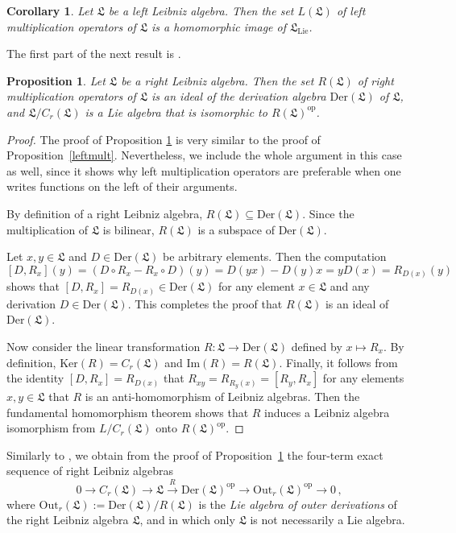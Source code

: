 \documentclass{amsart}
\newtheorem{pro}[thm]{Proposition}
\newtheorem{cor}[thm]{Corollary}
\numberwithin{equation}{section}
\newcommand{\op}{\mathrm{op}}
\newcommand{\der}{\mathrm{Der}}
\newcommand{\out}{\mathrm{Out}}
\newcommand{\lie}{\mathrm{Lie}}
\newcommand{\Ker}{\mathrm{Ker}}
\newcommand{\im}{\mathrm{Im}}
\newcommand{\lf}{\mathfrak{L}}
\begin{document}
\begin{cor}\label{leftleiblie}
Let $\lf$ be a left Leibniz algebra. Then the set $L(\lf)$ of left multiplication operators of $\lf$ is a
homomorphic image of $\lf_\lie$.
\end{cor}

The first part of the next result is \cite[Theorem 2.3]{FM}.

\begin{pro}\label{rightmult}
Let $\lf$ be a right Leibniz algebra. Then the set $R(\lf)$ of right multiplication operators of $\lf$
is an ideal of the derivation algebra $\der(\lf)$ of $\lf$, and $\lf/C_r(\lf)$ is a Lie algebra that is
isomorphic to $R(\lf)^\op$.
\end{pro}

\begin{proof}
The proof of Proposition \ref{rightmult} is very similar to the proof of Proposition~\ref{leftmult}.
Nevertheless, we include the whole argument in this case as well, since it shows why left multiplication
operators are preferable when one writes functions on the left of their arguments.

By definition of a right Leibniz algebra, $R(\lf)\subseteq\der(\lf)$. Since the multiplication of $\lf$ is
bilinear, $R(\lf)$ is a subspace of $\der(\lf)$.

Let $x,y\in\lf$ and $D\in\der(\lf)$ be arbitrary elements. Then the computation $$[D,R_x](y)=(D
\circ R_x-R_x\circ D)(y)=D(yx)-D(y)x=yD(x)=R_{D(x)}(y)$$ shows that $[D,R_x]=R_{D(x)}\in
\der(\lf)$ for any element $x\in\lf$ and any derivation $D\in\der(\lf)$. This completes the proof
that $R(\lf)$ is an ideal of $\der(\lf)$.

Now consider the linear transformation $R:\lf\to\der(\lf)$ defined by $x\mapsto R_x$. By definition,
$\Ker(R)=C_r(\lf)$ and $\im(R)=R(\lf)$. Finally, it follows from the identity $[D,R_x]=R_{D(x)}$
that $R_{xy}=R_{R_y(x)}=[R_y,R_x]$ for any elements $x,y\in\lf$ that $R$ is an anti-homomorphism
of Leibniz algebras. Then the fundamental homomorphism theorem shows that $R$ induces a Leibniz
algebra isomorphism from $L/C_r(\lf)$ onto $R(\lf)^\op$.
\end{proof}

 Similarly to \cite[Proposition 1.8]{DW}, we obtain from the proof of
Proposition~\ref{rightmult} the four-term exact sequence of right Leibniz algebras $$0\to C_r(\lf)
\to\lf\stackrel{R}\to\der(\lf)^\op\to\out_r(\lf)^\op\to 0\,,$$ where $\out_r(\lf):=\der(\lf)/R(\lf)$
is the {\em Lie algebra of outer derivations\/} of the right Leibniz algebra $\lf$, and in which only
$\lf$ is not necessarily a Lie algebra.
\vspace{.3cm}
\end{document}
